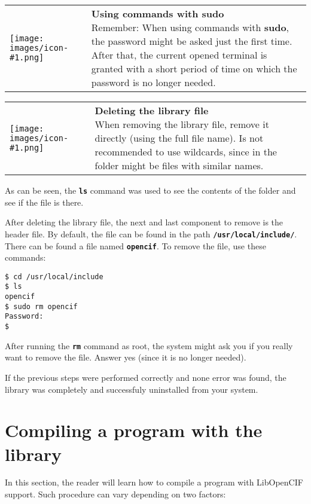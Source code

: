 \documentclass[11pt,twoside,openany,x11names,svgnames]{memoir}
\makeatletter
\newcommand{\IconNote}[3]
{
	\begin{table}[ht]
	\begin{tabular}{ lm{\dimexpr\textwidth-8\tabcolsep-\wd0}@{}}
		\toprule
		\texttt{[image: images/icon-\#1.png]}
		&
		\parbox[t]{155mm}{
		\textbf{#2} \\
		#3
		}
	\end{tabular}
\end{table}
}
\makeatother
\begin{document}
\IconNote
	{warning}
	{Using commands with sudo}
	{Remember: When using commands with \textbf{sudo}, the password might be asked just the first time. After that, the current opened terminal is granted with a short period of time on which the password is no longer needed.}

\IconNote
	{info}
	{Deleting the library file}
	{When removing the library file, remove it directly (using the full file name). Is not recommended to use wildcards, since in the folder might be files with similar names.}

As can be seen, the \textbf{\texttt{ls}} command was used to see the contents of the folder and see if the file is there.

After deleting the library file, the next and last component to remove is the header file.  By default, the file can be found in the path \textbf{\texttt{/usr/local/include/}}. There can be found a file named \textbf{\texttt{opencif}}. To remove the file, use these commands:

\begin{lstlisting}[frame=single,style=SystemCommandStyle]
$ cd /usr/local/include
$ ls
opencif
$ sudo rm opencif
Password:
$
\end{lstlisting}

After running the \textbf{\texttt{rm}} command as root, the system might ask you if you really want to remove the file. Answer yes (since it is no longer needed).

If the previous steps were performed correctly and none error was found, the library was completely and successfuly uninstalled from your system.


\section{Compiling a program with the library}\label{Compiling-a-program}

In this section, the reader will learn how to compile a program with LibOpenCIF support. Such procedure can vary depending on two factors:
\end{document}

